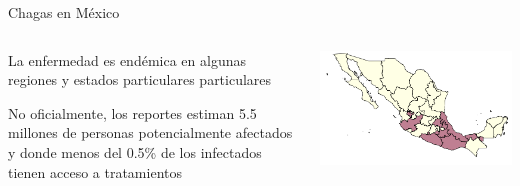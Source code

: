 \documentclass{beamer}
\begin{document}
\begin{frame}{Chagas en México}
	\begin{columns}
		\begin{column}{0.3\textwidth}

			La enfermedad es endémica en algunas regiones y estados particulares particulares


			\medskip No oficialmente, los reportes estiman 5.5 millones de personas potencialmente afectados y donde menos del 0.5\% de los infectados tienen acceso a tratamientos


		\end{column}
		\begin{column}{0.7\textwidth}
			\includegraphics[width=\textwidth]{slides/Ambientes_Gran_Chaco-Mexico_original.png}
		\end{column}
	\end{columns}
\end{frame}
\end{document}

